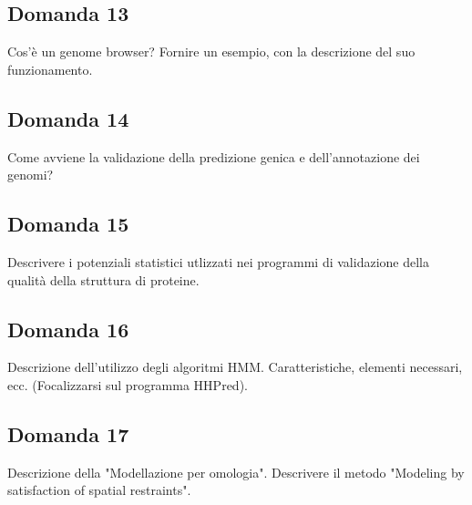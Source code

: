 \documentclass{article}
\begin{document}
\subsection*{Domanda 13}
Cos'è un genome browser? Fornire un esempio, con la descrizione del suo funzionamento.

\subsection*{Domanda 14}
Come avviene la validazione della predizione genica e dell'annotazione dei genomi?

\subsection*{Domanda 15}
Descrivere i potenziali statistici utlizzati nei programmi di validazione della qualità della struttura di proteine.

\subsection*{Domanda 16}
Descrizione dell'utilizzo degli algoritmi HMM. Caratteristiche, elementi necessari, ecc. (Focalizzarsi sul programma HHPred).

\subsection*{Domanda 17}
Descrizione della "Modellazione per omologia". Descrivere il metodo "Modeling by satisfaction of spatial restraints".
\end{document}
